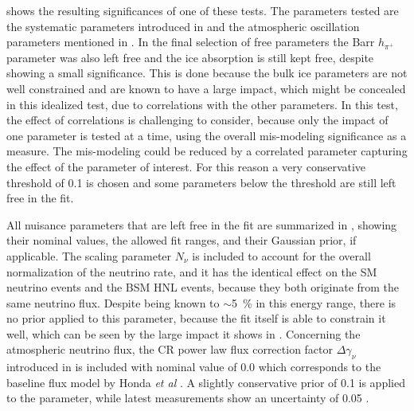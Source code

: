  shows the resulting significances of one of these tests. The parameters tested are the systematic parameters introduced in  and the atmospheric oscillation parameters mentioned in . In the final selection of free parameters the Barr $h_{\pi^+}$ parameter was also left free and the ice absorption is still kept free, despite showing a small significance. This is done because the bulk ice parameters are not well constrained and are known to have a large impact, which might be concealed in this idealized test, due to correlations with the other parameters. In this test, the effect of correlations is challenging to consider, because only the impact of one parameter is tested at a time, using the overall mis-modeling significance as a measure. The mis-modeling could be reduced by a correlated parameter capturing the effect of the parameter of interest. For this reason a very conservative threshold of \SI{0.1}{\sigma} is chosen and some parameters below the threshold are still left free in the fit.

All nuisance parameters that are left free in the fit are summarized in , showing their nominal values, the allowed fit ranges, and their Gaussian prior, if applicable. The scaling parameter $N_{\nu}$ is included to account for the overall normalization of the neutrino rate, and it has the identical effect on the SM neutrino events and the BSM HNL events, because they both originate from the same neutrino flux. Despite being known to $\sim$\SI{5}{\percent} in this energy range, there is no prior applied to this parameter, because the fit itself is able to constrain it well, which can be seen by the large impact it shows in . Concerning the atmospheric neutrino flux, the CR power law flux correction factor $\Delta \gamma_\nu$ introduced in  is included with nominal value of 0.0 which corresponds to the baseline flux model by Honda \textit{et al} . A slightly conservative prior of 0.1 is applied to the parameter, while latest measurements show an uncertainty of 0.05 .


